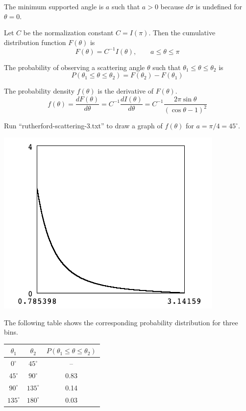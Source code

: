 \documentclass[12pt]{article}
\begin{document}
\noindent
The minimum supported angle is $a$ such that $a>0$ because $d\sigma$ is undefined for $\theta=0$.

\bigskip
\noindent
Let $C$ be the normalization constant $C=I(\pi)$.
Then the cumulative distribution function $F(\theta)$ is
\begin{equation*}
F(\theta)=C^{-1}I(\theta),
\qquad a\le\theta\le\pi
\end{equation*}

\noindent
The probability of observing a scattering angle $\theta$ such that $\theta_1\le\theta\le\theta_2$ is
\begin{equation*}
P(\theta_1\le\theta\le\theta_2)=F(\theta_2)-F(\theta_1)
\end{equation*}

\noindent
The probability density $f(\theta)$ is the derivative of $F(\theta)$.
\begin{equation*}
f(\theta)=\frac{dF(\theta)}{d\theta}=C^{-1}\frac{dI(\theta)}{d\theta}
=C^{-1}\frac{2\pi\sin\theta}{(\cos\theta-1)^2}
\end{equation*}

\noindent
Run ``rutherford-scattering-3.txt'' to draw a graph of $f(\theta)$ for $a=\pi/4=45^\circ$.

\begin{center}
\includegraphics[scale=0.5]{rutherford-scattering-ss1.png}
\end{center}

\noindent
The following table shows the corresponding probability distribution for three bins.

\begin{center}
\begin{tabular}{|c|c|c|}
\hline
$\theta_1$ & $\theta_2$ & $P(\theta_1\le\theta\le\theta_2)$\\
\hline
$0^\circ$ & $45^\circ$ & -- \\
$45^\circ$ & $90^\circ$ & 0.83 \\
$90^\circ$ & $135^\circ$ & 0.14 \\
$135^\circ$ & $180^\circ$ & 0.03 \\
\hline
\end{tabular}
\end{center}
\end{document}
